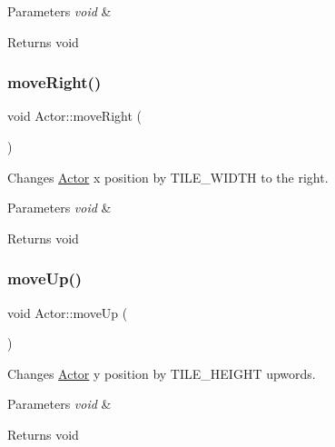 \begin{DoxyParams}{Parameters}
{\em void} & \\
\hline
\end{DoxyParams}
\begin{DoxyReturn}{Returns}
void 
\end{DoxyReturn}
\mbox{\label{class_actor_a66a756cd694913854af20352d4f0bedd}} 
\subsubsection{\texorpdfstring{move\+Right()}{moveRight()}}
{\footnotesize\ttfamily void Actor\+::move\+Right (\begin{DoxyParamCaption}\item[{void}]{ }\end{DoxyParamCaption})}



Changes \mbox{\hyperlink{class_actor}{Actor}} x position by T\+I\+L\+E\+\_\+\+W\+I\+D\+TH to the right. 


\begin{DoxyParams}{Parameters}
{\em void} & \\
\hline
\end{DoxyParams}
\begin{DoxyReturn}{Returns}
void 
\end{DoxyReturn}
\mbox{\label{class_actor_a096be226cbfb42f7595283703742da89}} 
\subsubsection{\texorpdfstring{move\+Up()}{moveUp()}}
{\footnotesize\ttfamily void Actor\+::move\+Up (\begin{DoxyParamCaption}\item[{void}]{ }\end{DoxyParamCaption})}



Changes \mbox{\hyperlink{class_actor}{Actor}} y position by T\+I\+L\+E\+\_\+\+H\+E\+I\+G\+HT upwords. 


\begin{DoxyParams}{Parameters}
{\em void} & \\
\hline
\end{DoxyParams}
\begin{DoxyReturn}{Returns}
void 
\end{DoxyReturn}
\mbox{\label{class_actor_ad0049dcc53c477e38400b0c41536c51a}} 
